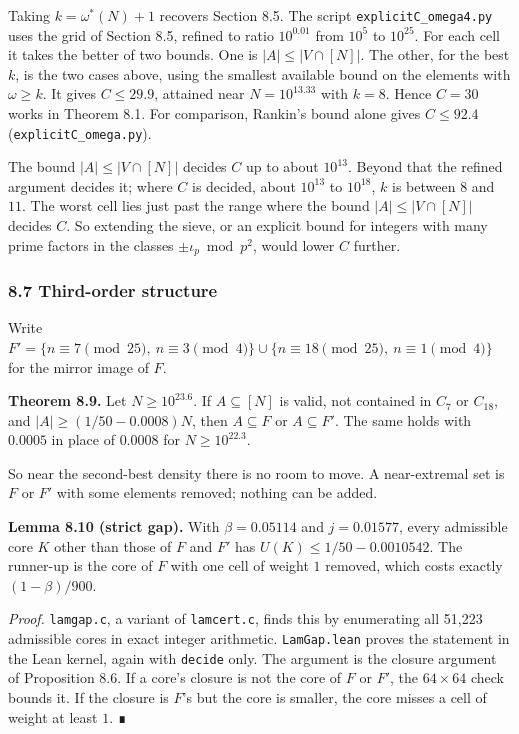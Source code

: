 \documentclass[
  11pt,
]{article}
\begin{document}
Taking \(k = \omega^*(N) + 1\) recovers Section 8.5. The script
\texttt{explicitC\_omega4.py} uses the grid of Section 8.5, refined to
ratio \(10^{0.01}\) from \(10^{5}\) to \(10^{25}\). For each cell it
takes the better of two bounds. One is \(|A| \le |V \cap [N]|\). The
other, for the best \(k\), is the two cases above, using the smallest
available bound on the elements with \(\omega \ge k\). It gives
\(C \le 29.9\), attained near \(N = 10^{13.33}\) with \(k = 8\). Hence
\(C = 30\) works in Theorem 8.1. For comparison, Rankin's bound alone
gives \(C \le 92.4\) (\texttt{explicitC\_omega.py}).

The bound \(|A| \le |V \cap [N]|\) decides \(C\) up to about
\(10^{13}\). Beyond that the refined argument decides it; where \(C\) is
decided, about \(10^{13}\) to \(10^{18}\), \(k\) is between \(8\) and
\(11\). The worst cell lies just past the range where the bound
\(|A| \le |V \cap [N]|\) decides \(C\). So extending the sieve, or an
explicit bound for integers with many prime factors in the classes
\(\pm\iota_p \bmod p^2\), would lower \(C\) further.

\subsubsection{8.7 Third-order structure}

Write
\(F' = \{n \equiv 7 \pmod{25},\ n \equiv 3 \pmod{4}\} \cup \{n \equiv 18 \pmod{25},\ n \equiv 1 \pmod{4}\}\)
for the mirror image of \(F\).

\textbf{Theorem 8.9.} Let \(N \ge 10^{23.6}\). If \(A \subseteq [N]\) is
valid, not contained in \(C_7\) or \(C_{18}\), and
\(|A| \ge (1/50 - 0.0008)N\), then \(A \subseteq F\) or
\(A \subseteq F'\). The same holds with \(0.0005\) in place of
\(0.0008\) for \(N \ge 10^{22.3}\).

So near the second-best density there is no room to move. A
near-extremal set is \(F\) or \(F'\) with some elements removed; nothing
can be added.

\textbf{Lemma 8.10 (strict gap).} With \(\beta = 0.05114\) and
\(j = 0.01577\), every admissible core \(K\) other than those of \(F\)
and \(F'\) has \(U(K) \le 1/50 - 0.0010542\). The runner-up is the core
of \(F\) with one cell of weight \(1\) removed, which costs exactly
\((1 - \beta)/900\).

\emph{Proof.} \texttt{lamgap.c}, a variant of \texttt{lamcert.c}, finds
this by enumerating all 51,223 admissible cores in exact integer
arithmetic. \texttt{LamGap.lean} proves the statement in the Lean
kernel, again with \texttt{decide} only. The argument is the closure
argument of Proposition 8.6. If a core's closure is not the core of
\(F\) or \(F'\), the \(64 \times 64\) check bounds it. If the closure is
\(F\)'s but the core is smaller, the core misses a cell of weight at
least \(1\). ∎
\end{document}
